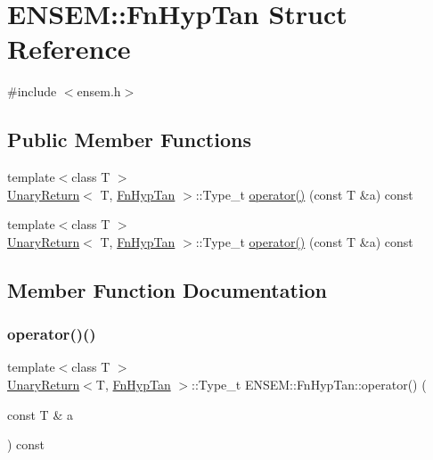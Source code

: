 \hypertarget{structENSEM_1_1FnHypTan}{}\section{E\+N\+S\+EM\+:\+:Fn\+Hyp\+Tan Struct Reference}
\label{structENSEM_1_1FnHypTan}


{\ttfamily \#include $<$ensem.\+h$>$}

\subsection*{Public Member Functions}
\begin{DoxyCompactItemize}
\item 
{\footnotesize template$<$class T $>$ }\\\mbox{\hyperlink{structENSEM_1_1UnaryReturn}{Unary\+Return}}$<$ T, \mbox{\hyperlink{structENSEM_1_1FnHypTan}{Fn\+Hyp\+Tan}} $>$\+::Type\+\_\+t \mbox{\hyperlink{structENSEM_1_1FnHypTan_a2a798b36a9dd79d1189263a0c58e0def}{operator()}} (const T \&a) const
\item 
{\footnotesize template$<$class T $>$ }\\\mbox{\hyperlink{structENSEM_1_1UnaryReturn}{Unary\+Return}}$<$ T, \mbox{\hyperlink{structENSEM_1_1FnHypTan}{Fn\+Hyp\+Tan}} $>$\+::Type\+\_\+t \mbox{\hyperlink{structENSEM_1_1FnHypTan_a2a798b36a9dd79d1189263a0c58e0def}{operator()}} (const T \&a) const
\end{DoxyCompactItemize}


\subsection{Member Function Documentation}
\mbox{\label{structENSEM_1_1FnHypTan_a2a798b36a9dd79d1189263a0c58e0def}} 
\subsubsection{\texorpdfstring{operator()()}{operator()()}\hspace{0.1cm}{\footnotesize\ttfamily [1/2]}}
{\footnotesize\ttfamily template$<$class T $>$ \\
\mbox{\hyperlink{structENSEM_1_1UnaryReturn}{Unary\+Return}}$<$T, \mbox{\hyperlink{structENSEM_1_1FnHypTan}{Fn\+Hyp\+Tan}} $>$\+::Type\+\_\+t E\+N\+S\+E\+M\+::\+Fn\+Hyp\+Tan\+::operator() (\begin{DoxyParamCaption}\item[{const T \&}]{a }\end{DoxyParamCaption}) const\hspace{0.3cm}{\ttfamily [inline]}}

